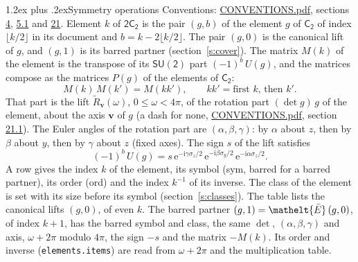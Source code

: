 \documentclass[10pt,a4paper]{article}
\makeatletter
\renewcommand\section{\@startsection{section}{1}{\z@}{-3ex plus -1ex minus -.2ex}%
  {1.2ex plus .2ex}{\normalfont\large\sffamily\bfseries\color{parttitle}}}
\numberwithin{equation}{section}
\newcommand{\eltfont}[1]{{\let\sigma\eltsigma\mathelt{#1}}}
\newcommand{\grp}[1]{\mathsf{#1}}
\newcommand{\elt}[1]{\eltfont{#1}}
\newcommand{\vv}{\mathbf{v}}
\newcommand{\iunit}{\mathrm{i}}
\newcommand{\expe}{\mathrm{e}}
\newcommand{\barred}[1]{\bar{#1}}
\newcommand{\lift}[1]{\tilde{#1}}
\newcommand{\pauli}[1]{\sigma_{#1}}
\makeatother
\begin{document}
\section{Symmetry operations}\label{s:elements}
Conventions: \href{../../CONVENTIONS.pdf}{CONVENTIONS.pdf}, sections \href{../../../rotation/CONVENTIONS.pdf\#conv.4}{4}, \href{../../../rotation/CONVENTIONS.pdf\#conv.5.1}{5.1} and \href{../../CONVENTIONS.pdf\#conv.21}{21}.
\leavevmode\label{n:index.element}\label{n:element.g}Element $k$ of $\grp{2C_{2}}$ is the pair $(g, b)$ of the element $g$ of \href{../../../rotation/data/pdf/C2.pdf}{$\grp{C_{2}}$} of index $\lfloor k/2\rfloor$ in its document and $b = k - 2\lfloor k/2\rfloor$. The pair $(g, 0)$ is the canonical lift of $g$, and $(g, 1)$ is its barred partner (section~\ref{s:cover}). \label{n:matrix.element.pin}\label{n:matrix.element}The matrix $M(k)$ of the element is the transpose of its $\grp{SU(2)}$ part $(-1)^{b}\,U(g)$, and the matrices compose as the matrices $P(g)$ of the elements of $\grp{C_{2}}$:
\begin{equation}\label{e:mprod}M(k)\,M(k') = M(kk'),\qquad kk' = \text{first } k\text{, then } k'.\end{equation}
\leavevmode\label{n:angle.omega}\label{n:vector.axis}\label{n:vector.pole}That part is the lift $\lift{R}_{\vv}(\omega)$, $0 \le \omega < 4\pi$, of the rotation part $(\det g)\,g$ of the element, about the axis $\vv$ of $g$ (a dash for none, \href{../../CONVENTIONS.pdf}{CONVENTIONS.pdf}, section \href{../../CONVENTIONS.pdf\#conv.21.1}{21.1}). \label{n:angle.euler.alpha}\label{n:angle.euler.beta}\label{n:angle.euler.gamma}\label{n:vector.coordinates}The Euler angles of the rotation part are $(\alpha,\beta,\gamma)$: by $\alpha$ about $z$, then by $\beta$ about $y$, then by $\gamma$ about $z$ (fixed axes). \label{n:local.euler.sign}The sign $s$ of the lift satisfies
\begin{equation}\label{e:euler}(-1)^{b}\,U(g) = s\,\expe^{-\iunit\gamma\pauli{z}/2}\,\expe^{-\iunit\beta\pauli{y}/2}\,\expe^{-\iunit\alpha\pauli{z}/2}.\end{equation}
\leavevmode\label{n:index.element.inverse}\label{n:head.sym}\label{n:head.ord}A row gives the index $k$ of the element, its symbol (sym, barred for a barred partner), its order (ord) and the index $k^{-1}$ of its inverse. \label{n:head.class}The class of the element is set with its size before its symbol (section~\ref{s:classes}).
The table lists the canonical lifts $(g, 0)$, of even $k$. The barred partner $(g, 1) = \elt{\barred{E}}\,(g, 0)$, of index $k + 1$, has the barred symbol and class, the same $\det$, $(\alpha,\beta,\gamma)$ and axis, $\omega + 2\pi$ modulo $4\pi$, the sign $-s$ and the matrix $-M(k)$. Its order and inverse (\texttt{elements.items}) are read from $\omega + 2\pi$ and the multiplication table.
\end{document}

